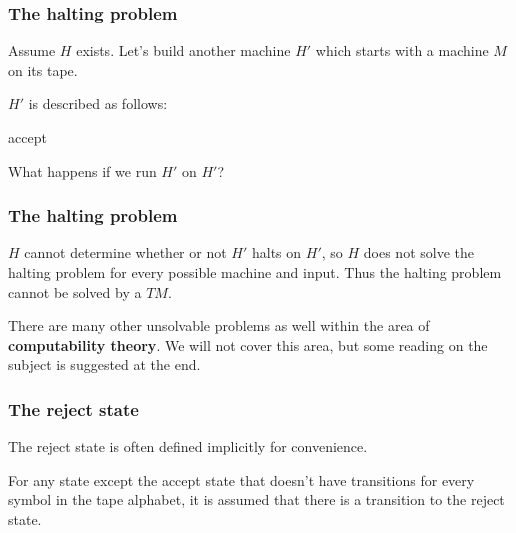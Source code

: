 \documentclass[aspectratio=169]{beamer}
\begin{document}
\begin{frame}[noframenumbering]
\frametitle{The halting problem}

Assume $H$ exists. Let's build another machine $H'$ which starts with a machine $M$ on its tape.

$H'$ is described as follows:
\begin{algorithm}[H]
{accept }
\end{algorithm}

What happens if we run $H'$ on $H'$?

\end{frame}

\begin{frame}
\frametitle{The halting problem}

$H$ cannot determine whether or not $H'$ halts on $H'$, so $H$ does not solve the halting problem for every possible machine and input. Thus the halting problem cannot be solved by a $TM$.

There are many other unsolvable problems as well within the area of {\bf computability theory}. We will not cover this area, but some reading on the subject is suggested at the end.

\end{frame}

\begin{frame}
\frametitle{The reject state}

The reject state is often defined implicitly for convenience.

For any state except the accept state that doesn't have transitions for every symbol in the tape alphabet, it is assumed that there is a transition to the reject state.

\begin{center}
\end{center}
\end{frame}
\end{document}
